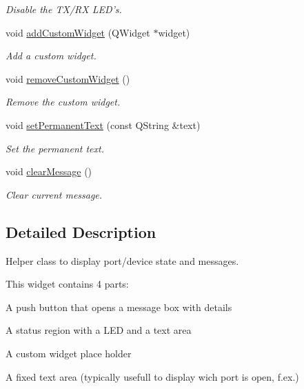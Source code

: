 \begin{DoxyCompactItemize}
\begin{DoxyCompactList}\small\item\em Disable the TX/RX LED's. \end{DoxyCompactList}\item 
void \hyperlink{classmdt_port_status_widget_ac14c1207abd242248538815542cb9068}{addCustomWidget} (QWidget $\ast$widget)
\begin{DoxyCompactList}\small\item\em Add a custom widget. \end{DoxyCompactList}\item 
void \hyperlink{classmdt_port_status_widget_a108227f8f64dd69edd2dcdca2b52b8a0}{removeCustomWidget} ()
\begin{DoxyCompactList}\small\item\em Remove the custom widget. \end{DoxyCompactList}\item 
void \hyperlink{classmdt_port_status_widget_a1b7fd23b45d75ccc106242026f3f8314}{setPermanentText} (const QString \&text)
\begin{DoxyCompactList}\small\item\em Set the permanent text. \end{DoxyCompactList}\item 
void \hyperlink{classmdt_port_status_widget_accb5d24aeec502ad00b36d253d7e139f}{clearMessage} ()
\begin{DoxyCompactList}\small\item\em Clear current message. \end{DoxyCompactList}\end{DoxyCompactItemize}


\subsection{Detailed Description}
Helper class to display port/device state and messages. 

This widget contains 4 parts:
\begin{DoxyItemize}
\item A push button that opens a message box with details
\item A status region with a LED and a text area
\item A custom widget place holder
\item A fixed text area (typically usefull to display wich port is open, f.ex.) 
\end{DoxyItemize}

